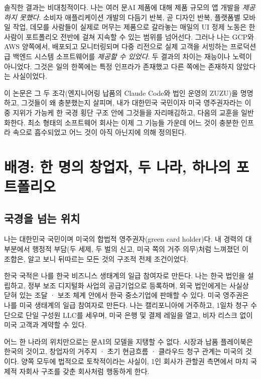 \documentclass{article}
\begin{document}
솔직한 결과는 비대칭적이다. 나는 여러 문AI 제품에 대해 제품 규모의 앱 개발을 \emph{제공하지 못했다}. 소비자 애플리케이션 개발의 다듬기 반복, 곧 디자인 반복, 플랫폼별 모바일 작업, 데모를 사람들이 실제로 머무는 제품으로 갈라놓는 매일의 UI 정제 노동은 한 사람이 포트폴리오 전반에 걸쳐 지속할 수 있는 범위를 넘어선다. 그러나 나는 GCP와 AWS 양쪽에서, 배포되고 모니터링되며 다중 리전으로 실제 고객을 서빙하는 프로덕션급 백엔드 시스템 소프트웨어를 \emph{제공할 수 있었다}. 두 결과의 차이는 재능이나 노력이 아니었다. 그것은 일의 한쪽에는 특정 인프라가 존재했고 다른 쪽에는 존재하지 않았다는 사실이었다.

이 논문은 그 두 조각(엔지니어링 납품의 Claude Code와 법인 운영의 ZUZU)을 명명하고, 그것들이 왜 충분했는지 살피며, 내가 대한민국 국민이자 미국 영주권자라는 이중 지위가 가능케 한 국경 횡단 구조 안에 그것들을 자리매김하고, 다음의 교훈을 일반화한다. 최소 형태의 소프트웨어 회사는 이제 그 기능들 가운데 어느 것이 충분한 인프라 속으로 흡수되었고 어느 것이 아직 아닌지에 의해 정의된다.

\section{배경: 한 명의 창업자, 두 나라, 하나의 포트폴리오}

\subsection{국경을 넘는 위치}

나는 대한민국 국민이며 미국의 합법적 영주권자(green card holder)다. 내 경력의 대부분에서 행정적 부담(두 세제, 두 벌의 신고, 미국 쪽의 거주 의무)처럼 느껴졌던 이 조합은, 알고 보니 뒤따르는 모든 것의 구조적 전제 조건이었다.

한국 국적은 나를 한국 비즈니스 생태계의 일급 참여자로 만든다. 나는 한국 법인을 설립하고, 정부 보조 디지털화 사업의 공급기업으로 등록하며, 외국 법인에게는 사실상 닫혀 있는 조달 · 보조 체계 안에서 한국 중소기업에 판매할 수 있다. 미국 영주권은 나를 미국 생태계의 일급 참여자로 만든다. 나는 캘리포니아에 거주하고, 1일차 청구 수단으로 단일 구성원 LLC를 세우며, 미국 은행 및 결제 레일을 열고, 비자 리스크 없이 미국 고객과 계약할 수 있다.

어느 한 나라의 위치만으로는 문AI의 모델을 지탱할 수 없다. 시장과 납품 플레이북은 한국의 것이고, 창업자의 거주지 · 초기 현금흐름 · 클라우드 청구 관계는 미국의 것이다. 양쪽 모두에 법적으로 토착적이라는 사실이, 1인 회사가 관할권 측면에서 마치 국제적 자회사 구조를 갖춘 회사처럼 행동하게 한다.
\end{document}
